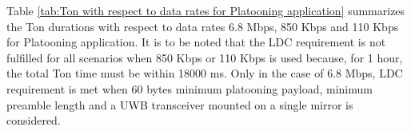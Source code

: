 \begin{table}[]
    \centering
    \caption{Ton with respect to data rates for Platooning application}
    \label{tab:Ton with respect to data rates for Platooning application}
\end{table}

Table \ref{tab:Ton with respect to data rates for Platooning application} summarizes the Ton durations with respect to data rates 6.8 Mbps, 850 Kbps and 110 Kbps for Platooning application. It is to be noted that the LDC requirement is not fulfilled for all scenarios when 850 Kbps or 110 Kbps is used because, for 1 hour, the total Ton time must be within 18000 ms. Only in the case of 6.8 Mbps, LDC requirement is met when 60 bytes minimum platooning payload, minimum preamble length and a UWB transceiver mounted on a single mirror is considered. 